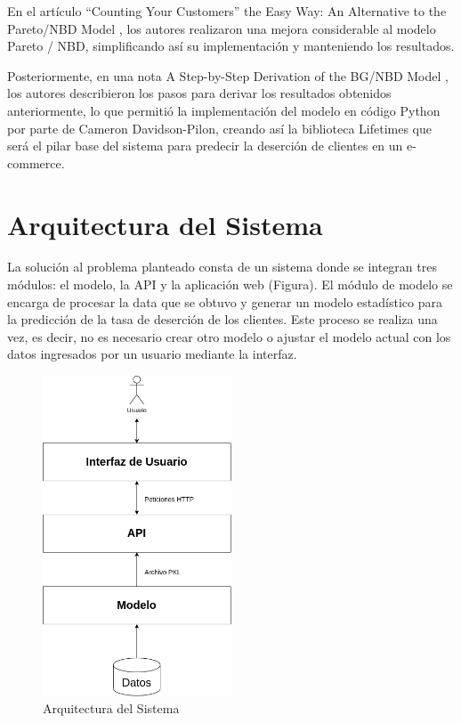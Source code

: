 	En el artículo “Counting Your Customers” the Easy Way: An Alternative to the Pareto/NBD Model \cite{fader2005}, los autores realizaron una mejora considerable al modelo Pareto / NBD, simplificando así su implementación y manteniendo los resultados.

	Posteriormente, en una nota A Step-by-Step Derivation of the BG/NBD Model \cite{fader2019}, los autores describieron los pasos para derivar los resultados obtenidos anteriormente, lo que permitió la implementación del modelo en código Python por parte de Cameron Davidson-Pilon, creando así la biblioteca Lifetimes que será el pilar base del sistema para predecir la deserción de clientes en un e-commerce.

\section{Arquitectura del Sistema}

La solución al problema planteado consta de un sistema donde se integran tres módulos: el modelo, la API y la aplicación web (Figura). El módulo de modelo se encarga de procesar la data que se obtuvo y generar un modelo estadístico para la predicción de la tasa de deserción de los clientes. Este proceso se realiza una vez, es decir, no es necesario crear otro modelo o ajustar el modelo actual con los datos ingresados por un usuario mediante la interfaz.

\begin{figure}[H]
	\centering \includegraphics[width=0.50\textwidth]{images/arquitectura-proyecto-de-grado.png}
	\caption{Arquitectura del Sistema}
	\label{fig:arq}
\end{figure}

